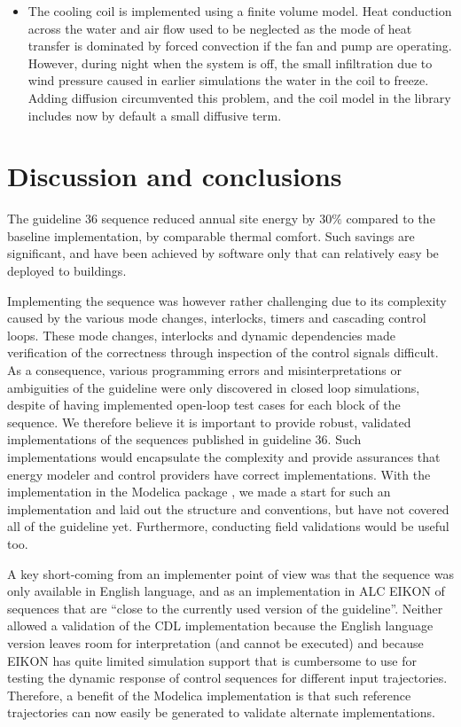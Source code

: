 \documentclass[letterpaper,10pt, openany,english]{sphinxmanual}
\begin{document}
\begin{itemize}
\item {} 
 The cooling coil is implemented using a finite volume model.
Heat conduction across the water and air flow used to be neglected as the
mode of heat transfer is dominated by forced convection if the fan and pump are operating.
However, during night when the system is off, the small infiltration due to wind pressure caused in
earlier simulations the water in the coil to freeze. Adding diffusion
circumvented this problem, and the coil model in the library includes now by default
a small diffusive term.

\end{itemize}


\section{Discussion and conclusions}
\label{\detokenize{example:discussion-and-conclusions}}\label{\detokenize{example:sec-dis-con-cas1}}
The guideline 36 sequence reduced annual site energy by \(30\%\)
compared to the baseline implementation, by comparable thermal comfort.
Such savings are significant, and have been achieved by software only
that can relatively easy be deployed to buildings.

Implementing the sequence was however rather challenging due to its
complexity caused by the various mode changes, interlocks, timers and cascading control loops.
These mode changes, interlocks and dynamic dependencies
made verification of the correctness through inspection of the control signals difficult.
As a consequence, various programming errors and misinterpretations or ambiguities
of the guideline were only discovered in closed loop simulations,
despite of having implemented open-loop test cases for each block of the sequence.
We therefore believe it is important to provide robust, validated
implementations of the sequences published in guideline 36.
Such implementations would encapsulate the complexity and provide
assurances that energy modeler and control providers have correct implementations.
With the implementation in
the Modelica package , we made a start
for such an implementation and laid out the structure and conventions,
but have not covered all of the guideline yet.
Furthermore, conducting field validations would be useful too.

A key short-coming from an implementer point of view was that the
sequence was only available in English language, and as an implementation
in ALC EIKON of sequences that are “close to the currently used version of the
guideline”. Neither allowed a validation of the CDL implementation
because the English language version leaves room for interpretation (and cannot
be executed) and because EIKON has quite limited simulation support
that is cumbersome to use for testing the dynamic response of
control sequences for different input
trajectories. Therefore, a benefit of the Modelica implementation is that
such reference trajectories can now easily be generated to validate alternate
implementations.
\end{document}
